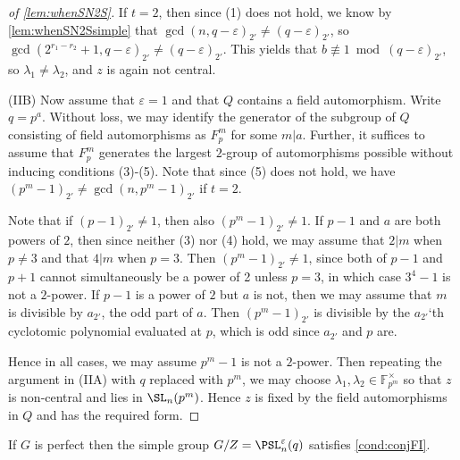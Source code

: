 \documentclass[eqthmnum, nocolour]{jt-calcs}
\renewcommand{\epsilon}{\varepsilon}
\begin{document}
\begin{proof}[of \cref{lem:whenSN2S}]
If $t=2$, then since (1) does not hold, we know by \cref{lem:whenSN2Ssimple} that $\gcd(n,q-\epsilon)_{2'}\neq(q-\epsilon)_{2'}$, so $\gcd(2^{r_1-r_2}+1, q-\epsilon)_{2'}\neq(q-\epsilon)_{2'}$.  This yields that $b\not\equiv1\bmod{(q-\epsilon)_{2'}}$, so $\lambda_1\neq\lambda_2$, and $z$ is again not central.  

(IIB) Now assume that $\epsilon=1$ and that $Q$ contains a field automorphism.  Write $q=p^a$.  Without loss, we may identify the generator of the subgroup of $Q$ consisting of field automorphisms as $F_p^m$ for some $m|a$.   Further, it suffices to assume that $F_p^m$ generates the largest $2$-group of automorphisms possible without inducing conditions (3)-(5).  Note that since (5) does not hold, we have $(p^m-1)_{2'}\neq \gcd(n, p^m-1)_{2'}$ if $t=2$.
   
Note that if $(p-1)_{2'}\neq1$, then also $(p^m-1)_{2'}\neq 1$.  If $p-1$ and $a$ are both powers of $2$, then since neither (3) nor (4) hold, we may assume that $2|m$ when $p\neq 3$ and that $4|m$ when $p=3$.  Then $(p^m-1)_{2'}\neq 1$, since both of $p-1$ and $p+1$ cannot simultaneously be a power of 2 unless $p=3$, in which case $3^4-1$ is not a $2$-power.   If $p-1$ is a power of $2$ but $a$ is not, then we may assume that $m$ is divisible by $a_{2'}$, the odd part of $a$.  Then $(p^m-1)_{2'}$ is divisible by the $a_{2'}$`th cyclotomic polynomial evaluated at $p$, which is odd since $a_{2'}$ and $p$ are.   

Hence in all cases, we may assume $p^m-1$ is not a $2$-power.  Then repeating the argument in (IIA) with $q$ replaced with $p^m$, we may choose $\lambda_1, \lambda_2\in\mathbb{F}_{p^m}^\times$ so that $z$ is non-central and lies in $\SL_n(p^m)$.  Hence $z$ is fixed by the field automorphisms in $Q$ and has the required form. 
\end{proof}

\begin{proposition}\label{prop:typeAconjFI}
If $G$ is perfect then the simple group $G/Z = \PSL_n^\epsilon(q)$ satisfies \cref{cond:conjFI}.
\end{proposition}
\end{document}

